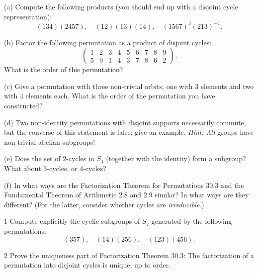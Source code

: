 \begin{problem}[Warmup]{(a)}
    Compute the following products (you should end up with a disjoint cycle representation): \[(134)(2457), \quad (12)(13)(14), \quad {(1567)}^3{(213)}^{-1}.\]
\end{problem}
\unsolved

\begin{problem}[Warmup]{(b)}
    Factor the following permutation as a product of disjoint cycles: \[\begin{pmatrix} 1 & 2 & 3 & 4 & 5 & 6 & 7 & 8 & 9 \\ 5 & 9 & 1 & 4 & 3 & 7 & 8 & 6 & 2 \end{pmatrix}.\] What is the order of this permutation?
\end{problem}
\unsolved

\begin{problem}[Warmup]{(c)}
    Give a permutation with three non-trivial orbits, one with 3 elements and two with 4 elements each. What is the order of the permutation you have constructed?
\end{problem}
\unsolved

\begin{problem}[Warmup]{(d)}
    Two non-identity permutations with disjoint supports necessarily commute, but the converse of this statement is false; give an example. \emph{Hint:} \emph{All} groups have non-trivial abelian subgroups!
\end{problem}
\unsolved

\begin{problem}[Warmup]{(e)}
    Does the set of 2-cycles in $S_4$ (together with the identity) form a subgroup? What about 3-cycles, or 4-cycles?
\end{problem}
\unsolved

\begin{problem}[Warmup]{(f)}
    In what ways are the Factorization Theorem for Permutations 30.3 and the Fundamental Theorem of Arithmetic 2.8 and 2.9 similar? In what ways are they different? (For the latter, consider whether cycles are \emph{irreducible}.)
\end{problem}
\unsolved

\begin{problem}{1}
    Compute explicitly the cyclic subgroups of $S_7$ generated by the following
    permutations:
    \[(357), \quad (14)(256), \quad (123)(456).\]
\end{problem}
\unsolved

\begin{problem}{2}
    Prove the uniqueness part of Factorization Theorem 30.3: The factorization of a
    permutation into disjoint cycles is unique, up to order.
\end{problem}
\unsolved

